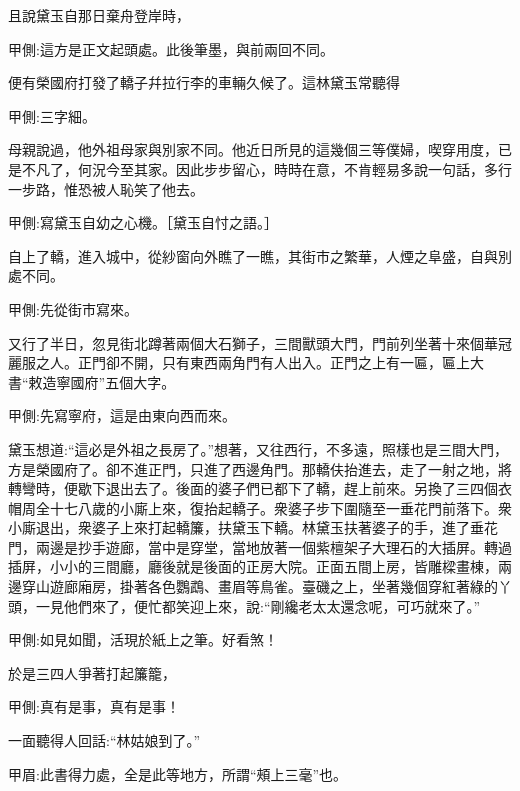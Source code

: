 \begin{parag}
    且說黛玉自那日棄舟登岸時，\begin{note}甲側:這方是正文起頭處。此後筆墨，與前兩回不同。\end{note}便有榮國府打發了轎子幷拉行李的車輛久候了。這林黛玉常聽得\begin{note}甲側:三字細。\end{note}母親說過，他外祖母家與別家不同。他近日所見的這幾個三等僕婦，喫穿用度，已是不凡了，何況今至其家。因此步步留心，時時在意，不肯輕易多說一句話，多行一步路，惟恐被人恥笑了他去。\begin{note}甲側:寫黛玉自幼之心機。［黛玉自忖之語。］\end{note}自上了轎，進入城中，從紗窗向外瞧了一瞧，其街市之繁華，人煙之阜盛，自與別處不同。\begin{note}甲側:先從街市寫來。\end{note}又行了半日，忽見街北蹲著兩個大石獅子，三間獸頭大門，門前列坐著十來個華冠麗服之人。正門卻不開，只有東西兩角門有人出入。正門之上有一匾，匾上大書“敕造寧國府”五個大字。\begin{note}甲側:先寫寧府，這是由東向西而來。\end{note}黛玉想道:“這必是外祖之長房了。”想著，又往西行，不多遠，照樣也是三間大門，方是榮國府了。卻不進正門，只進了西邊角門。那轎伕抬進去，走了一射之地，將轉彎時，便歇下退出去了。後面的婆子們已都下了轎，趕上前來。另換了三四個衣帽周全十七八歲的小廝上來，復抬起轎子。衆婆子步下圍隨至一垂花門前落下。衆小廝退出，衆婆子上來打起轎簾，扶黛玉下轎。林黛玉扶著婆子的手，進了垂花門，兩邊是抄手遊廊，當中是穿堂，當地放著一個紫檀架子大理石的大插屏。轉過插屏，小小的三間廳，廳後就是後面的正房大院。正面五間上房，皆雕樑畫棟，兩邊穿山遊廊廂房，掛著各色鸚鵡、畫眉等鳥雀。臺磯之上，坐著幾個穿紅著綠的丫頭，一見他們來了，便忙都笑迎上來，說:“剛纔老太太還念呢，可巧就來了。”\begin{note}甲側:如見如聞，活現於紙上之筆。好看煞！\end{note}於是三四人爭著打起簾籠，\begin{note}甲側:真有是事，真有是事！\end{note}一面聽得人回話:“林姑娘到了。”\begin{note}甲眉:此書得力處，全是此等地方，所謂“頰上三毫”也。\end{note}
\end{parag}


